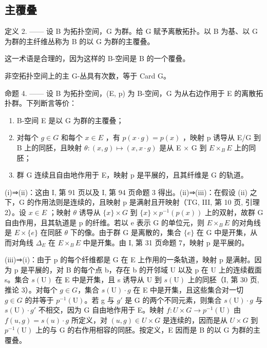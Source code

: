 \subsection{主覆叠}

定义 2. —— 设 B 为拓扑空间，G 为群。给 G 赋予离散拓扑。以 B 为基、以 G 为群的主纤维丛称为 B 的以 G 为群的主覆叠。

这一术语是合理的，因为这样的 B-空间是 B 的一个覆叠。

非空拓扑空间上的主 G-丛具有次数，等于 Card G。

命题 4. —— 设 B 为拓扑空间，(E, p) 为 B-空间，G 为从右边作用于 E 的离散拓扑群。下列断言等价：

\begin{enumerate}
\def\labelenumi{(\roman{enumi})}
\item
  B-空间 E 是以 G 为群的主覆叠；
\item
  对每个 \(g \in G\) 和每个 \(x \in E\) ，有 \(p(x \cdot g) = p(x)\) ，映射 p 诱导从 E/G 到 B 上的同胚，且映射 \(\theta: (x, g) \mapsto (x, x \cdot g)\) 是从 E × G 到 \(E \times_{B} E\) 上的同胚；
\item
  群 G 连续且自由地作用于 E，映射 p 是平展的，且其纤维是 G 的轨道。
\end{enumerate}

(i)⇒(ii)：这由 I, 第 91 页以及 I, 第 94 页命题 3 得出。(ii)⇒(iii)：在假设 (ii) 之下，G 的作用法则是连续的，且映射 p 是满射且开映射（TG, III, 第 10 页, 引理 2）。设 \(x \in E\) ；映射 \(\theta\) 诱导从 \(\{x\} \times G\) 到 \(\{x\} \times p^{-1}(p(x))\) 上的双射，故群 G 自由作用，且其轨道是 p 的纤维。若以 e 表示 G 的单位元，则 \(E \times_{B} E\) 的对角线是 \(E \times \{e\}\) 在同胚 \(\theta\) 下的像。由于群 G 是离散的，集合 \(\{e\}\) 在 G 中是开集，从而对角线 \(\Delta_{E}\) 在 \(E \times_{B} E\) 中是开集。由 I, 第 31 页命题 7，映射 p 是平展的。

(iii)⇒(i)：由于 p 的每个纤维都是 G 在 E 上作用的一条轨道，映射 p 是满射。因为 p 是平展的，对 B 的每个点 b，存在 b 的开邻域 U 以及 p 在 U 上的连续截面 s。集合 \(s(\mathrm{U})\) 在 E 中是开集，且 s 诱导从 U 到 \(s(\mathrm{U})\) 上的同胚（I, 第 30 页, 推论 3）。对每个 \(g \in G\)，集合 \(s(\mathrm{U}) \cdot g\) 在 E 中是开集，且这些集合对一切 \(g \in G\) 的并等于 \(p^{-1}(\mathrm{U})\)。若 g 与 \(g'\) 是 G 的两个不同元素，则集合 \(s(\mathrm{U}) \cdot g\) 与 \(s(\mathrm{U}) \cdot g'\) 不相交，因为 G 自由地作用于 E。映射 \(f: U \times G \to p^{-1}(\mathrm{U})\) 由 \(f(u, g) = s(u) \cdot g\) 所定义，对 \((u, g) \in U \times G\) 是连续的，因而是从 \(U \times G\) 到 \(p^{-1}(\mathrm{U})\) 上的与 G 的右作用相容的同胚。按定义，E 因而是 B 的以 G 为群的主覆叠。

